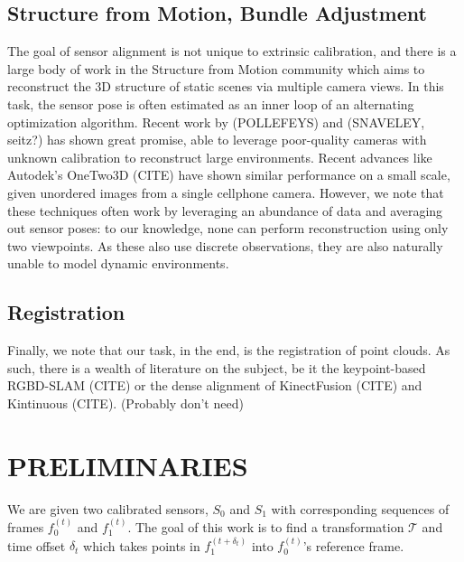 \documentclass[letterpaper, 10 pt, conference]{ieeeconf}  %
\begin{document}
\subsection{Structure from Motion, Bundle Adjustment}

The goal of sensor alignment is not unique to extrinsic calibration, and there is a large body of work in the 
Structure from Motion community which aims to reconstruct the 3D structure of static scenes via multiple camera 
views. In this task, the sensor pose is often estimated as an inner loop of an alternating optimization algorithm. 
Recent work by (POLLEFEYS) and (SNAVELEY, seitz?) has shown great promise, able to leverage poor-quality cameras with 
unknown calibration to reconstruct large environments. Recent advances like Autodek's OneTwo3D (CITE) have shown 
similar performance on a small scale, given unordered images from a single cellphone camera. However, we note 
that these techniques often work by leveraging an abundance of data and averaging out sensor poses: to our knowledge, 
none can perform reconstruction using only two viewpoints. As these also use discrete observations, they are also 
naturally unable to model dynamic environments.

\subsection{Registration}
Finally, we note that our task, in the end, is the registration of point clouds. As such, there is a wealth of 
literature on the subject, be it the keypoint-based RGBD-SLAM (CITE) or the dense alignment of KinectFusion (CITE) 
and Kintinuous (CITE). (Probably don't need)




\section{PRELIMINARIES}

We are given two calibrated sensors, $S_0$ and $S_1$ with corresponding sequences of frames $f_0^{(t)}$ and $f_1^{(t)}$. 
The goal of this work is to find a transformation $\mathcal{T}$ and time offset $\delta_t$ which takes points in $f_1^{(t+\delta_t)}$ into $f_0^{(t)}$'s reference frame. 
\end{document}
